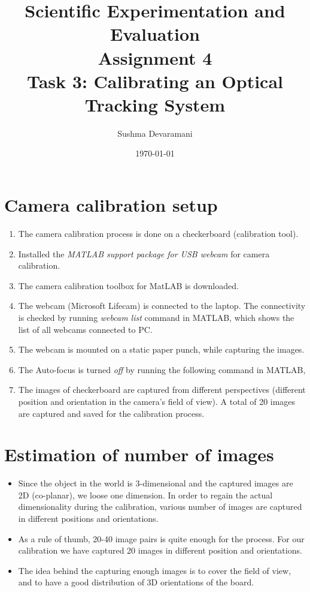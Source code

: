 \documentclass[11pt,a4paper,titlepage]{article}
\title{\blueb Scientific Experimentation and Evaluation \\
\blueb Assignment 4 \\ Task 3: Calibrating an Optical Tracking System}
\author{Sushma Devaramani}
\date{\today}
\begin{document}
\maketitle
\tableofcontents
\newpage
\section{Camera calibration setup}
\begin{enumerate}
\item The camera calibration process is done on a checkerboard (calibration tool).
\item Installed the \textit{MATLAB support package for USB webcam} for camera calibration.
\item The camera calibration toolbox for MatLAB is downloaded.
\item The webcam (Microsoft Lifecam) is connected to the laptop. The connectivity is checked by running \textit{webcam list} command in MATLAB, which shows the list of all webcams connected to PC.
\item The webcam is mounted on a static paper punch, while capturing the images.
\item The Auto-focus is turned \textit{off} by running the following command in MATLAB, \\ 
\item The images of checkerboard are captured from different perspectives (different position and orientation in the camera's field of view). A total of 20 images are captured and saved for the calibration process.
\end{enumerate}

\section{Estimation of number of images}
\begin{itemize}
\item Since the object in the world is 3-dimensional and the captured images are 2D (co-planar), we loose one dimension. In order to regain the actual dimensionality during the calibration, various number of images are captured in different positions and orientations. 
\item As a rule of thumb, 20-40 image pairs is quite enough for the process. For our calibration we have captured 20 images in different position and orientations. 
\item The idea behind the capturing enough images is to cover the field of view, and to have a good distribution of 3D orientations of the board. 
\end{itemize}
\end{document}
